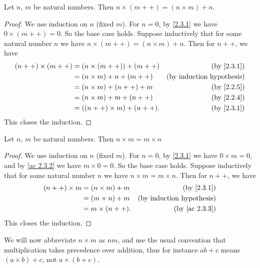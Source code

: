 \begin{additional corollary}\label{ac 2.3.3}
Let \(n\), \(m\) be natural numbers.
Then \(n \times (m++) = (n \times m) + n\).
\end{additional corollary}

\begin{proof}
  We use induction on \(n\) (fixed \(m\)).
  For \(n = 0\), by \cref{2.3.1} we have \(0 \times (m++) = 0\).
  So the base case holds.
  Suppose inductively that for some natural number \(n\) we have \(n \times (m++) = (n \times m) + n\).
  Then for \(n++\), we have
  \begin{align*}
    (n++) \times (m++)
     & = (n \times (m++)) + (m++)  & \text{(by \cref{2.3.1})}         \\
     & = (n \times m) + n + (m++)  & \text{(by induction hypothesis)} \\
     & = (n \times m) + (n++) + m  & \text{(by \cref{2.2.5})}         \\
     & = (n \times m) + m + (n++)  & \text{(by \cref{2.2.4})}         \\
     & = ((n++) \times m) + (n++). & \text{(by \cref{2.3.1})}
  \end{align*}
  This closes the induction.
\end{proof}

\begin{lemma}\label{2.3.2}
  Let \(n\), \(m\) be natural numbers.
  Then \(n \times m = m \times n\)
\end{lemma}

\begin{proof}
  We use induction on \(n\) (fixed \(m\)).
  For \(n = 0\), by \cref{2.3.1} we have \(0 \times m = 0\), and by \cref{ac 2.3.2} we have \(m \times 0 = 0\).
  So the base case holds.
  Suppose inductively that for some natural number \(n\) we have \(n \times m = m \times n\).
  Then for \(n++\), we have
  \begin{align*}
    (n++) \times m & = (n \times m) + m & \text{(by \cref{2.3.1})}         \\
                   & = (m \times n) + m & \text{(by induction hypothesis)} \\
                   & = m \times (n++).  & \text{(by \cref{ac 2.3.3})}
  \end{align*}
  This closes the induction.
\end{proof}

\begin{note}
  We will now abbreviate \(n \times m\) as \(nm\), and use the usual convention that multiplication takes precedence over addition, thus for instance \(ab + c\) means \((a \times b) + c\), not \(a \times (b + c)\).
\end{note}


